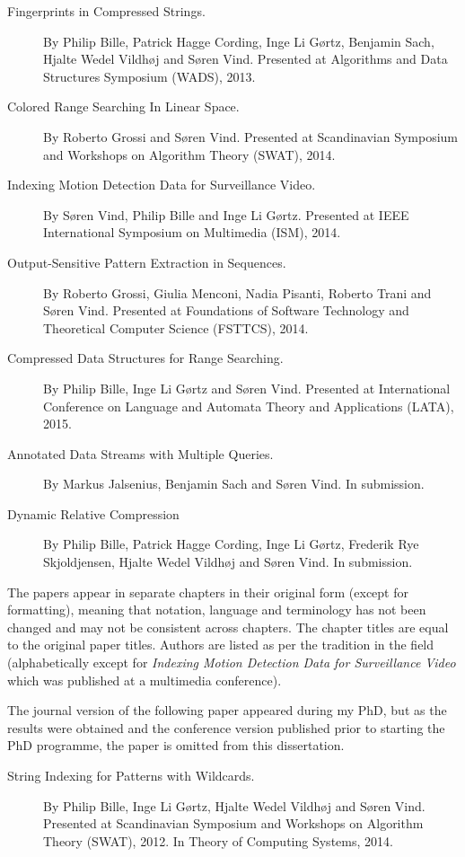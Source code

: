 \begin{description}
    \item[Fingerprints in Compressed Strings.] By Philip Bille, Patrick Hagge Cording, Inge Li Gørtz, Benjamin Sach, Hjalte Wedel Vildhøj and Søren Vind. Presented at Algorithms and Data Structures Symposium (WADS), 2013.
    \item[Colored Range Searching In Linear Space.] By Roberto Grossi and Søren Vind. Presented at Scandinavian Symposium and Workshops on Algorithm Theory (SWAT), 2014.
    \item[Indexing Motion Detection Data for Surveillance Video.] By Søren Vind, Philip Bille and Inge Li Gørtz. Presented at IEEE International Symposium on Multimedia (ISM), 2014.
    \item[Output-Sensitive Pattern Extraction in Sequences.] By Roberto Grossi, Giulia Menconi, Nadia Pisanti, Roberto Trani and Søren Vind. Presented at Foundations of Software Technology and Theoretical Computer Science (FSTTCS), 2014.
    \item[Compressed Data Structures for Range Searching.] By Philip Bille, Inge Li Gørtz and Søren Vind. Presented at International Conference on Language and Automata Theory and Applications (LATA), 2015.
    \item[Annotated Data Streams with Multiple Queries.] By Markus Jalsenius, Benjamin Sach and Søren Vind. In submission.
    \item[Dynamic Relative Compression] By Philip Bille, Patrick Hagge Cording, Inge Li Gørtz, Frederik Rye Skjoldjensen, Hjalte Wedel Vildhøj and Søren Vind. In submission.
\end{description}

The papers appear in separate chapters in their original form (except for formatting), meaning that notation, language and terminology has not been changed and may not be consistent across chapters. The chapter titles are equal to the original paper titles. Authors are listed as per the tradition in the field (alphabetically except for \emph{Indexing Motion Detection Data for Surveillance Video} which was published at a multimedia conference). 

The journal version of the following paper appeared during my PhD, but as the results were obtained and the conference version published prior to starting the PhD programme, the paper is omitted from this dissertation.

\begin{description}
    \item[String Indexing for Patterns with Wildcards.] By Philip Bille, Inge Li Gørtz, Hjalte Wedel Vildhøj and Søren Vind. Presented at Scandinavian Symposium and Workshops on Algorithm Theory (SWAT), 2012. In Theory of Computing Systems, 2014. 
\end{description}
 

